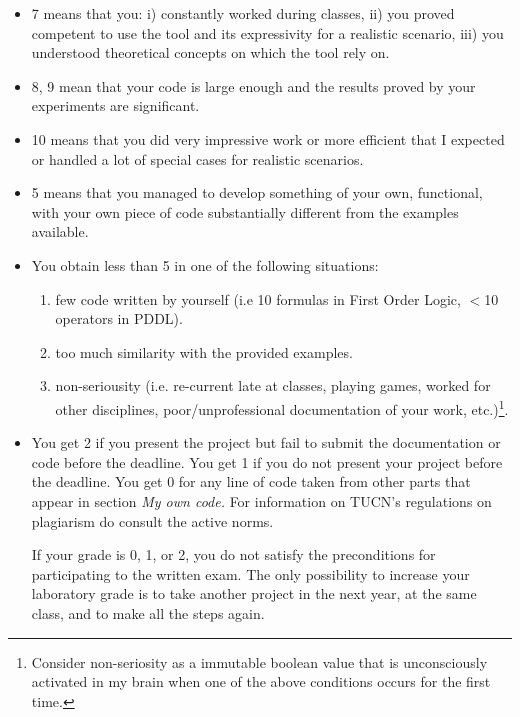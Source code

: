 \begin{itemize}

\item 7 means that you: 
i) constantly worked during classes, 
 ii) you proved competent to use the tool and its expressivity for a realistic scenario, 
iii) you understood theoretical concepts on which the tool rely on.

\item 8, 9 mean that your code is large enough and the results proved by your experiments are significant.

 \item 10 means that you did very impressive work or more efficient 
that I expected or handled a lot of special cases for realistic scenarios.


\item 5 means that you managed to develop something of your own, functional, 
with your own piece of code substantially different from the examples available.

\item You obtain less than 5 in one of the following situations: 

\begin{enumerate}
\item few code written by yourself (i.e 10 formulas in First Order Logic, $<$10 operators in PDDL).
\item too much similarity with the provided examples.
\item non-seriousity (i.e. re-current late at classes, playing games, worked for other disciplines, 
poor/unprofessional documentation of your work, etc.)\footnote{Consider non-seriosity as a immutable boolean value that 
is unconsciously activated in my brain when one of the above conditions occurs for the first time.}.
\end{enumerate}

\item You get 2 if you present the project but fail to submit the documentation or code before the deadline.
You get 1 if you do not present your project before the deadline.
You get 0 for any line of code taken from other parts that appear in section {\it My own code.} 
For information on TUCN's regulations on plagiarism do consult the active norms.

If your grade is 0, 1, or 2, you do not satisfy 
the preconditions for participating to the written exam. 
The only possibility to increase your laboratory grade is to take another project in the next year, 
at the same class, and to make all the steps again.   
\end{itemize}

